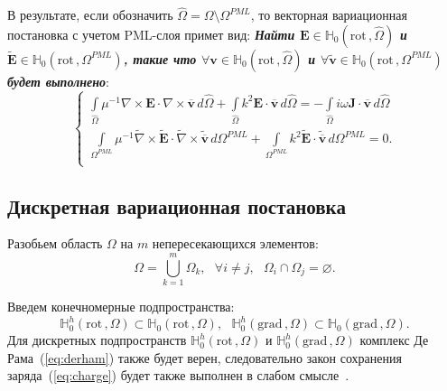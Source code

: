 \documentclass[a4paper,14pt]{article}
\begin{document}
В результате, если обозначить $\widehat{\Omega} = \Omega \setminus {\Omega^{PML}}$, то векторная вариационная постановка с учетом PML-слоя примет вид: \textbf{\textit{Найти $\mathbf{E} \in \mathbb{H}_{0}( \mathrm{rot}\,, \widehat{\Omega} )$ и  $\tilde{\mathbf{E}} \in \mathbb{H}_{0}( \mathrm{rot}\,, {\Omega^{PML}} )$, такие что $\forall \mathbf{v} \in \mathbb{H}_{0}( \mathrm{rot}\,, \widehat{\Omega} )$ и $\forall \tilde{\mathbf{v}} \in \mathbb{H}_{0}( \mathrm{rot}\,, {\Omega^{PML}} )$ будет выполнено}}:
\begin{equation*}
	\begin{cases}
		\displaystyle
		\int\limits_{\widehat{\Omega}} \mu^{-1} \nabla \times \mathbf{E} \cdot \nabla \times \overline{\mathbf{v}} \,d\widehat{\Omega} + \int\limits_{\widehat{\Omega}} k^{2} \mathbf{E} \cdot \overline{\mathbf{v}} \,d\widehat{\Omega} = - \int\limits_{\widehat{\Omega}} i \omega \mathbf{J} \cdot \overline{\mathbf{v}} \,d\widehat{\Omega} \\
		\displaystyle
		\int\limits_{{\Omega^{PML}}} \mu^{-1} \tilde{\nabla} \times \tilde{\mathbf{E}} \cdot \tilde{\nabla} \times \tilde{\overline{\mathbf{v}}} \,d{\Omega^{PML}} + \int\limits_{{\Omega^{PML}}} k^{2} \tilde{\mathbf{E}} \cdot \tilde{\overline{\mathbf{v}}} \,d{\Omega^{PML}} = 0 . \\
	\end{cases}
\end{equation*}


\subsection{Дискретная вариационная постановка}
Разобьем область $\Omega$ на $m$ непересекающихся элементов:
\begin{equation*}
	\Omega = \bigcup\limits_{k=1}^{m} \Omega_k , \text{~~} \forall i \neq j , \text{~~} \Omega_i \cap \Omega_j = \varnothing .
\end{equation*}

Введем конечномерные подпространства:
\begin{equation*}
	\mathbb{H}_{0}^h( \mathrm{rot}\,, \Omega ) \subset \mathbb{H}_{0}( \mathrm{rot}\,, \Omega ) , \text{~~}
	\mathbb{H}_{0}^h( \mathrm{grad}\,, \Omega ) \subset \mathbb{H}_{0}( \mathrm{grad}\,, \Omega ) .
\end{equation*}
Для дискретных подпространств $\mathbb{H}_{0}^h( \mathrm{rot}\,, \Omega )$ и $\mathbb{H}_{0}^h( \mathrm{grad}\,, \Omega )$ комплекс Де Рама~(\ref{eq:derham}) также будет верен, следовательно закон сохранения заряда~(\ref{eq:charge}) будет также выполнен в слабом смысле~\citep{epov}.
\end{document}
